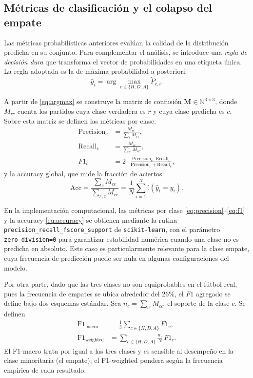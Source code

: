 \subsection{M\'etricas de clasificaci\'on y el colapso del empate}
\label{subsec:clasificacion}

Las m\'etricas probabil\'isticas anteriores eval\'uan la calidad de la distribuci\'on predicha en su conjunto. Para complementar el an\'alisis, se introduce una \emph{regla de decisi\'on dura} que transforma el vector de probabilidades en una etiqueta \'unica. La regla adoptada es la de m\'axima probabilidad a posteriori:
\begin{equation}\label{eq:argmax}
	\hat{y}_i = \arg\max_{c\in\{H,D,A\}} \tilde{P}_{c,i}.
\end{equation}

A partir de \eqref{eq:argmax} se construye la matriz de confusi\'on $\mathbf{M} \in \mathbb{N}^{3\times 3}$, donde $M_{rc}$ cuenta los partidos cuya clase verdadera es $r$ y cuya clase predicha es $c$. Sobre esta matriz se definen las m\'etricas por clase:
\begin{align}
	\mathrm{Precision}_c &= \frac{M_{cc}}{\sum_{r} M_{rc}}, \label{eq:precision}\\
	\mathrm{Recall}_c &= \frac{M_{cc}}{\sum_{c'} M_{cc'}}, \label{eq:recall}\\
	F1_c &= 2 \cdot \frac{\mathrm{Precision}_c \cdot \mathrm{Recall}_c}{\mathrm{Precision}_c + \mathrm{Recall}_c}, \label{eq:f1}
\end{align}
y la accuracy global, que mide la fracci\'on de aciertos:
\begin{equation}\label{eq:accuracy}
	\mathrm{Acc} = \frac{\sum_c M_{cc}}{\sum_{r,c} M_{rc}} = \frac{1}{N}\sum_{i=1}^{N} \mathbb{I}(\hat{y}_i = y_i).
\end{equation}

En la implementaci\'on computacional, las m\'etricas por clase \eqref{eq:precision}--\eqref{eq:f1} y la accuracy \eqref{eq:accuracy} se obtienen mediante la rutina \texttt{precision\_recall\_fscore\_support} de \texttt{scikit-learn}, con el par\'ametro \texttt{zero\_division=0} para garantizar estabilidad num\'erica cuando una clase no es predicha en absoluto. Este caso es particularmente relevante para la clase empate, cuya frecuencia de predicci\'on puede ser nula en algunas configuraciones del modelo. 

Por otra parte, dado que las tres clases no son equiprobables en el f\'utbol real, pues la frecuencia de empates se ubica alrededor del $26\%$, el $F1$ agregado se define bajo dos esquemas est\'andar. Sea $n_c = \sum_{c'} M_{cc'}$ el soporte de la clase $c$. Se definen
\begin{align}
	\mathrm{F1}_{\mathrm{macro}} &= \frac{1}{3}\sum_{c\in\{H,D,A\}} F1_c, \label{eq:f1_macro}\\
	\mathrm{F1}_{\mathrm{weighted}} &= \sum_{c\in\{H,D,A\}} \frac{n_c}{N}\, F1_c. \label{eq:f1_weighted}
\end{align}
El F1-macro trata por igual a las tres clases y es sensible al desempe\~no en la clase minoritaria (el empate); el F1-weighted pondera seg\'un la frecuencia emp\'irica de cada resultado.

